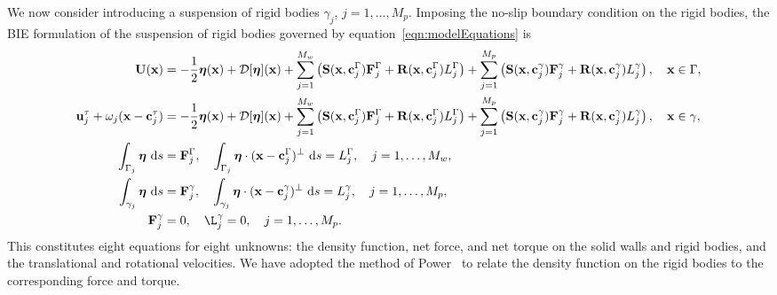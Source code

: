 \documentclass[preprint, 10pt]{elsarticle}
\begin{document}
We now consider introducing a suspension of rigid bodies $\gamma_j$,
$j=1,\ldots,M_p$.  Imposing the no-slip boundary condition on the rigid
bodies, the BIE formulation of the suspension of rigid bodies governed
by equation~\eqref{eqn:modelEquations} is
\begin{subequations}
  \label{eqn:BIEformulation}
\begin{align}
  \UU(\xx) &= -\frac{1}{2}\eeta(\xx) + \DD[\eeta](\xx) +
    \sum_{j=1}^{M_w} \left(\mathbf{S}(\xx,\cc^\Gamma_j)\FF^\Gamma_j + 
      \mathbf{R}(\xx,\cc^\Gamma_j)L^\Gamma_j\right) + 
    \sum_{j=1}^{M_p} \left(\mathbf{S}(\xx,\cc^\gamma_j)\FF^\gamma_j + 
      \mathbf{R}(\xx,\cc^\gamma_j)L^\gamma_j\right), 
    \quad \xx \in \Gamma, \label{eqn:BIEformulation1} \\
  \uu^\tau_j + \omega_j(\xx - \cc_j^\tau) &=
    -\frac{1}{2}\eeta(\xx) + \DD[\eeta](\xx) + 
    \sum_{j=1}^{M_w} \left(\mathbf{S}(\xx,\cc^\Gamma_j)\FF^\Gamma_j + 
      \mathbf{R}(\xx,\cc^\Gamma_j)L^\Gamma_j\right) + 
    \sum_{j=1}^{M_p} \left(\mathbf{S}(\xx,\cc^\gamma_j)\FF^\gamma_j + 
      \mathbf{R}(\xx,\cc^\gamma_j)L^\gamma_j\right), 
    \quad \xx \in \gamma, \label{eqn:BIEformulation2} \\
  \int_{\Gamma_j} \eeta~\text{d}s &= \FF^\Gamma_j, \quad
  \int_{\Gamma_j} \eeta\cdot (\xx - \cc^\Gamma_j)^\perp~\text{d}s =
  L^\Gamma_j, \quad j=1,\ldots,M_w, \label{eqn:BIEformulation3} \\
  \int_{\gamma_j} \eeta~\text{d}s &= \FF^\gamma_j, \quad
  \int_{\gamma_j} \eeta\cdot (\xx - \cc^\gamma_j)^\perp~\text{d}s =
  L^\gamma_j,\quad j=1,\ldots,M_p, \label{eqn:BIEformulation4} \\
  \FF^\gamma_j &= 0, \quad \L^\gamma_j = 0,\quad j=1,\ldots,M_p.
  \label{eqn:BIEformulation5}
\end{align}
\end{subequations}
This constitutes eight equations for eight unknowns: the density
function, net force, and net torque on the solid walls and rigid bodies,
and the translational and rotational velocities.  We have adopted the
method of Power~\cite{Power1993} to relate the density function on the
rigid bodies to the corresponding force and torque.
\end{document}
